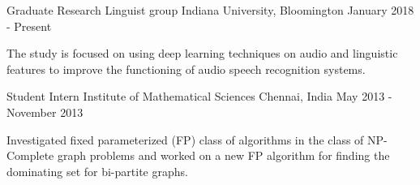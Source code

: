 \begin{cventries}
    \cventry
    {Graduate Research}
    {Linguist group}
    {Indiana University, Bloomington}
    {January 2018 - Present}
    {
    \begin{cvitems}
    \item{The study is focused on using deep learning techniques on audio and linguistic features to improve the functioning of audio speech recognition systems.}
    \end{cvitems}
    }
    \cventry
    {Student Intern}
    {Institute of Mathematical Sciences}
    {Chennai, India}
    {May 2013 - November 2013}
    {
    \begin{cvitems}
    \item{Investigated fixed parameterized (FP) class of algorithms in the class of NP-Complete graph problems and worked on a new FP algorithm for finding the dominating set for bi-partite graphs.}
    \end{cvitems}
    }
    
    \end{cventries}

